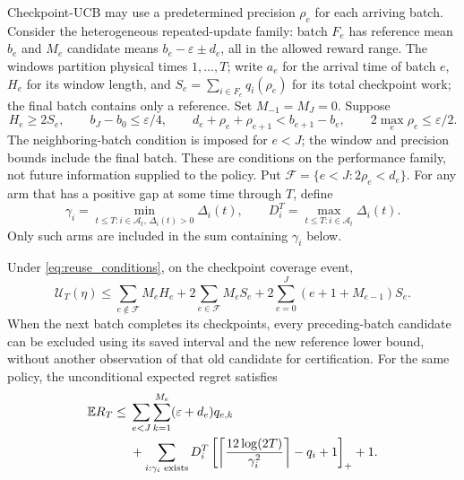 \documentclass[11pt]{article}
\begin{document}
Checkpoint-UCB may use a predetermined precision $\rho_e$ for each arriving
batch. Consider the heterogeneous repeated-update family: batch $F_e$ has
reference mean $b_e$ and $M_e$ candidate means
$b_e-\varepsilon\pm d_e$, all in the allowed reward range. The windows
partition physical times $1,\ldots,T$; write $a_e$ for the arrival time of
batch $e$, $H_e$ for its window length, and
$S_e=\sum_{i\in F_e}q_i(\rho_e)$ for its total checkpoint work; the final
batch contains only a reference. Set $M_{-1}=M_J=0$. Suppose
\begin{equation}
 H_e\ge2S_e,\qquad b_J-b_0\le\varepsilon/4,\qquad
 d_e+\rho_e+\rho_{e+1}<b_{e+1}-b_e,\qquad
 2\max_e\rho_e\le\varepsilon/2.
 \label{eq:reuse_conditions}
\end{equation}
The neighboring-batch condition is imposed for $e<J$; the window and
precision bounds include the final batch. These are conditions on the
performance family, not future information supplied to the policy. Put
$\mathcal F=\{e<J:2\rho_e<d_e\}$. For any arm that has a positive gap at
some time through $T$, define
\[
 \gamma_i=\min_{t\le T:i\in\mathcal A_t,\,\Delta_i(t)>0}\Delta_i(t),
 \qquad
 D_i^T=\max_{t\le T:i\in\mathcal A_t}\Delta_i(t).
\]
Only such arms are included in the sum containing $\gamma_i$ below.

\begin{proposition}
\label{thm:reuse}
Under \eqref{eq:reuse_conditions}, on the checkpoint coverage event,
\begin{equation}
 \mathcal U_T(\eta)\le
 \sum_{e\notin\mathcal F}M_eH_e+
 2\sum_{e\in\mathcal F}M_eS_e+
 2\sum_{e=0}^J(e+1+M_{e-1})S_e.
 \label{eq:reuse_area}
\end{equation}
When the next batch completes its checkpoints, every preceding-batch candidate
can be excluded using its saved interval and the new reference lower bound,
without another observation of that old candidate for certification.
For the same policy, the unconditional expected regret satisfies
\begin{equation}
 \begin{aligned}
 \mathbb E R_T\le{}&\sum_{e<J}\sum_{k=1}^{M_e}(\varepsilon+d_e)q_{e,k}\\
 &+\sum_{i:\gamma_i\text{ exists}}D_i^T
 \left[\left\lceil\frac{12\log(2T)}{\gamma_i^2}\right\rceil-q_i+1\right]_+
 +1.
 \end{aligned}
 \label{eq:reuse_regret}
\end{equation}
\end{proposition}
\end{document}
